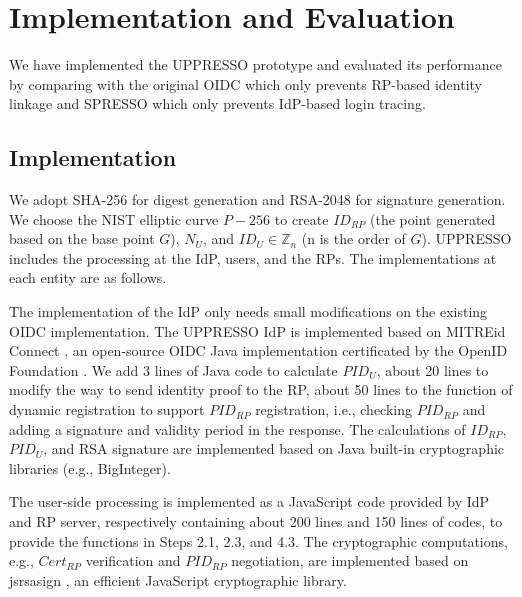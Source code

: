 \section{Implementation and Evaluation}
\label{sec:implementation}
We have implemented the UPPRESSO prototype and evaluated its performance by comparing with the original OIDC which only prevents RP-based identity linkage and SPRESSO which only prevents IdP-based login tracing.

\subsection{Implementation}
We adopt SHA-256 for digest generation and  RSA-2048 for signature generation. %
We choose the NIST elliptic curve $P-256$ to create $ID_{RP}$ (the point generated based on the base point $G$), $N_U$, and $ID_U \in \mathbb{Z}_n$ (n is the order of $G$).
UPPRESSO includes the processing at the IdP, users, and the RPs.
The implementations at each entity are as follows.

The implementation of the IdP only needs small modifications on the existing OIDC implementation.
The UPPRESSO IdP is implemented based on MITREid Connect \cite{MITREid}, an open-source OIDC Java implementation certificated by the OpenID Foundation \cite{OIDF}.
We add 3 lines of Java code to calculate $PID_U$, about 20 lines to modify the way to send identity proof to the RP,
about 50 lines to the function of dynamic registration to support $PID_{RP}$ registration,
 i.e., checking $PID_{RP}$ and adding a signature and validity period in the response.  %
The calculations of $ID_{RP}$, $PID_U$, and RSA signature are implemented based on Java built-in cryptographic libraries (e.g., BigInteger).

The user-side processing is implemented as a JavaScript code provided by IdP and RP server, respectively containing about 200 lines and 150 lines of codes,
to provide the functions in Steps 2.1, 2.3, and 4.3.
The cryptographic computations, e.g., $Cert_{RP}$ verification and $PID_{RP}$ negotiation, are implemented based on jsrsasign \cite{jsrsasign}, an efficient JavaScript cryptographic library.

